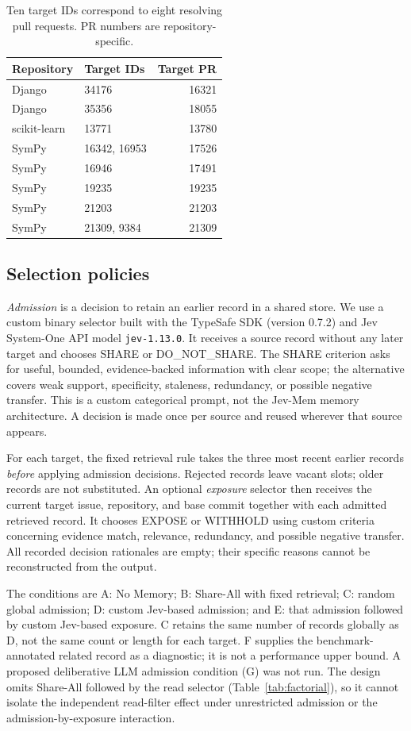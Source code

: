 \documentclass[sigconf,anonymous]{aamas}
\begin{document}
\begin{table}[t]
\caption{Ten target IDs correspond to eight resolving pull requests. PR numbers are repository-specific.}
\label{tab:pr-groups}
\centering
\small
\begin{tabular}{llr}
\toprule
Repository & Target IDs & Target PR\\
\midrule
Django & 34176 & 16321\\
Django & 35356 & 18055\\
scikit-learn & 13771 & 13780\\
SymPy & 16342, 16953 & 17526\\
SymPy & 16946 & 17491\\
SymPy & 19235 & 19235\\
SymPy & 21203 & 21203\\
SymPy & 21309, 9384 & 21309\\
\bottomrule
\end{tabular}
\end{table}

\subsection{Selection policies}
\emph{Admission} is a decision to retain an earlier record in a shared store. We use a custom binary selector built with the TypeSafe SDK (version 0.7.2) and Jev System-One API model \texttt{jev-1.13.0}. It receives a source record without any later target and chooses SHARE or DO\_NOT\_SHARE. The SHARE criterion asks for useful, bounded, evidence-backed information with clear scope; the alternative covers weak support, specificity, staleness, redundancy, or possible negative transfer. This is a custom categorical prompt, not the Jev-Mem memory architecture. A decision is made once per source and reused wherever that source appears.

For each target, the fixed retrieval rule takes the three most recent earlier records \emph{before} applying admission decisions. Rejected records leave vacant slots; older records are not substituted. An optional \emph{exposure} selector then receives the current target issue, repository, and base commit together with each admitted retrieved record. It chooses EXPOSE or WITHHOLD using custom criteria concerning evidence match, relevance, redundancy, and possible negative transfer. All recorded decision rationales are empty; their specific reasons cannot be reconstructed from the output.

The conditions are A: No Memory; B: Share-All with fixed retrieval; C: random global admission; D: custom Jev-based admission; and E: that admission followed by custom Jev-based exposure. C retains the same number of records globally as D, not the same count or length for each target. F supplies the benchmark-annotated related record as a diagnostic; it is not a performance upper bound. A proposed deliberative LLM admission condition (G) was not run. The design omits Share-All followed by the read selector (Table~\ref{tab:factorial}), so it cannot isolate the independent read-filter effect under unrestricted admission or the admission-by-exposure interaction.
\end{document}
